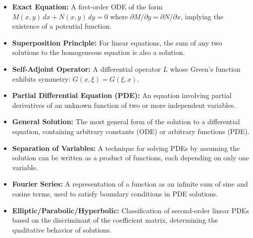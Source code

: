 \begin{itemize}
    \item \textbf{Exact Equation:} A first-order ODE of the form \( M(x,y)\,dx + N(x,y)\,dy = 0 \) where \( \partial M/\partial y = \partial N/\partial x \), implying the existence of a potential function.

    \item \textbf{Superposition Principle:} For linear equations, the sum of any two solutions to the homogeneous equation is also a solution.

    \item \textbf{Self-Adjoint Operator:} A differential operator $L$ whose Green's function exhibits symmetry: $G(x,\xi) = G(\xi,x)$.

    \item \textbf{Partial Differential Equation (PDE):} An equation involving partial derivatives of an unknown function of two or more independent variables.

    \item \textbf{General Solution:} The most general form of the solution to a differential equation, containing arbitrary constants (ODE) or arbitrary functions (PDE).

    \item \textbf{Separation of Variables:} A technique for solving PDEs by assuming the solution can be written as a product of functions, each depending on only one variable.

    \item \textbf{Fourier Series:} A representation of a function as an infinite sum of sine and cosine terms, used to satisfy boundary conditions in PDE solutions.

    \item \textbf{Elliptic/Parabolic/Hyperbolic:} Classification of second-order linear PDEs based on the discriminant of the coefficient matrix, determining the qualitative behavior of solutions.
\end{itemize}

